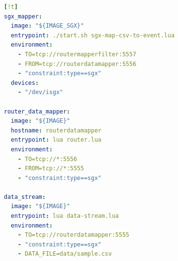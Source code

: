 \begin{lstlisting}[language=YAML,caption={\SYS pipeline description. Few attributes (\texttt{volume}, \texttt{networks}, \texttt{env\_file}) omitted.},label=pipeline-desc][!t]
sgx_mapper:
  image: "${IMAGE_SGX}"
  entrypoint: ./start.sh sgx-map-csv-to-event.lua
  environment:
    - TO=tcp://routermapperfilter:5557
    - FROM=tcp://routerdatamapper:5556
    - "constraint:type==sgx"
  devices:
    - "/dev/isgx"

router_data_mapper:
  image: "${IMAGE}"
  hostname: routerdatamapper
  entrypoint: lua router.lua
  environment:
    - TO=tcp://*:5556
    - FROM=tcp://*:5555
    - "constraint:type==sgx"

data_stream:
  image: "${IMAGE}"
  entrypoint: lua data-stream.lua
  environment:
    - TO=tcp://routerdatamapper:5555
    - "constraint:type==sgx"
    - DATA_FILE=data/sample.csv
\end{lstlisting}


